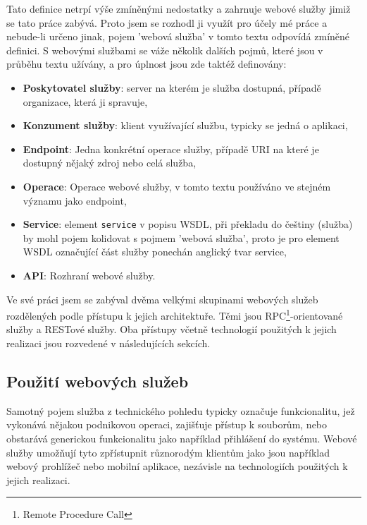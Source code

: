 \documentclass[czech,DP]{thesiskiv}
\begin{document}
Tato definice netrpí výše zmíněnými nedostatky a zahrnuje webové služby jimiž se tato práce zabývá. Proto jsem se rozhodl ji využít pro účely mé práce a nebude-li určeno jinak, pojem 'webová služba' v tomto textu odpovídá zmíněné definici. S webovými službami se váže několik dalších pojmů, které jsou v průběhu textu užívány, a pro úplnost jsou zde taktéž definovány:


\begin{itemize}
	\item \textbf{Poskytovatel služby}: server na kterém je služba dostupná, případě organizace, která ji spravuje,
	\item \textbf{Konzument služby}: klient využívající službu, typicky se jedná o aplikaci,
	\item \textbf{Endpoint}: Jedna konkrétní operace služby, případě URI na které je dostupný nějaký zdroj nebo celá služba,
	\item \textbf{Operace}: Operace webové služby, v tomto textu používáno ve stejném významu jako endpoint,
	\item \textbf{Service}: element \verb|service| v popisu WSDL, při překladu do češtiny (služba) by mohl pojem kolidovat s pojmem 'webová služba', proto je pro element WSDL označující část služby ponechán anglický tvar service,
	\item \textbf{API}: Rozhraní webové služby.
\end{itemize}

Ve své práci jsem se zabýval dvěma velkými skupinami webových služeb rozdělených podle přístupu k jejich architektuře. Těmi jsou RPC\footnote{Remote Procedure Call}-orientované služby a RESTové služby. Oba přístupy včetně technologií použitých k jejich realizaci jsou rozvedené v následujících sekcích.

\subsection{Použití webových služeb}

Samotný pojem služba z technického pohledu typicky označuje funkcionalitu, jež vykonává nějakou podnikovou operaci, zajišťuje přístup k souborům, nebo obstarává generickou funkcionalitu jako například přihlášení do systému. Webové služby umožňují tyto zpřístupnit různorodým klientům jako jsou například webový prohlížeč nebo mobilní aplikace, nezávisle na technologiích použitých k jejich realizaci.
\end{document}
